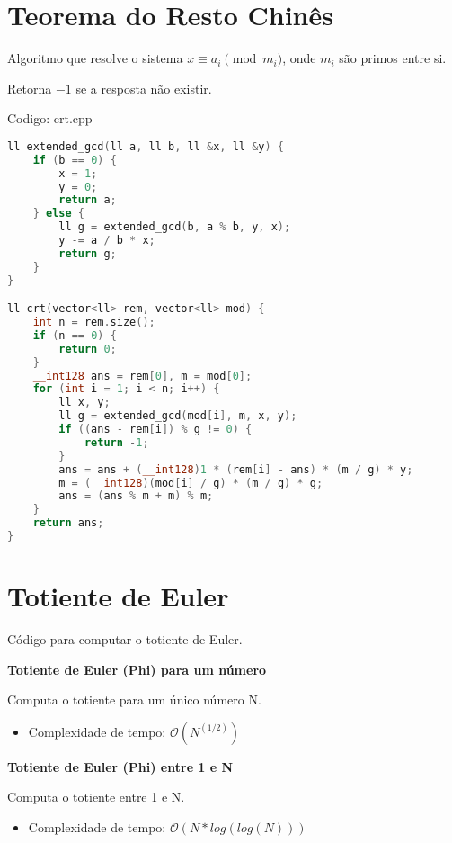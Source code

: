 \documentclass[10pt, a4paper, oneside]{book}
\begin{document}
\section{Teorema do Resto Chinês}


Algoritmo que resolve o sistema $x \equiv a_i \pmod{m_i}$, onde $m_i$ são primos entre si.



Retorna $-1$ se a resposta não existir.

\hfill

Codigo: crt.cpp

\begin{lstlisting}[language=C++]
ll extended_gcd(ll a, ll b, ll &x, ll &y) {
    if (b == 0) {
        x = 1;
        y = 0;
        return a;
    } else {
        ll g = extended_gcd(b, a % b, y, x);
        y -= a / b * x;
        return g;
    }
}

ll crt(vector<ll> rem, vector<ll> mod) {
    int n = rem.size();
    if (n == 0) {
        return 0;
    }
    __int128 ans = rem[0], m = mod[0];
    for (int i = 1; i < n; i++) {
        ll x, y;
        ll g = extended_gcd(mod[i], m, x, y);
        if ((ans - rem[i]) % g != 0) {
            return -1;
        }
        ans = ans + (__int128)1 * (rem[i] - ans) * (m / g) * y;
        m = (__int128)(mod[i] / g) * (m / g) * g;
        ans = (ans % m + m) % m;
    }
    return ans;
}
\end{lstlisting}
\hfill

\section{Totiente de Euler}


Código para computar o totiente de Euler.



\textbf{Totiente de Euler (Phi) para um número} 

Computa o totiente para um único número N.



\begin{itemize}
\item Complexidade de tempo: $\mathcal{O}(N^(1/2))$
\end{itemize}



\textbf{Totiente de Euler (Phi) entre 1 e N} 

Computa o totiente entre 1 e N.



\begin{itemize}
\item Complexidade de tempo: $\mathcal{O}(N * log(log(N)))$
\end{itemize}
\end{document}
